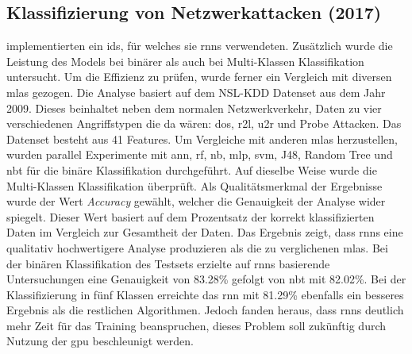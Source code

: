 \documentclass[
    12pt, %
    DIV10,
    ngerman, %
    a4paper, %
    oneside, %
    titlepage, %
    parskip=half, %
    headings=normal, %
    listof=totoc, %
    bibliography=totoc, %
    index=totoc, %
    captions=tableheading, %
    final %
]{scrreprt}
\begin{document}
\subsection{Klassifizierung von Netzwerkattacken (2017)}
\textcite{Yin2017} implementierten ein \ac{ids}, für welches sie \ac{rnns} verwendeten. Zusätzlich wurde die Leistung des Models bei binärer als auch bei Multi-Klassen Klassifikation untersucht. Um die Effizienz zu prüfen, wurde ferner ein Vergleich mit diversen \ac{mlas} gezogen. Die Analyse basiert auf dem NSL-KDD Datenset aus dem Jahr 2009. Dieses beinhaltet neben dem normalen Netzwerkverkehr, Daten zu vier verschiedenen Angriffstypen die da wären: \ac{dos}, \ac{r2l}, \ac{u2r} und Probe Attacken. Das Datenset besteht aus 41 Features. Um Vergleiche mit anderen \ac{mlas} herzustellen, wurden parallel Experimente mit \ac{ann}, \ac{rf}, \ac{nb}, \ac{mlp}, \ac{svm}, J48, Random Tree und \ac{nbt} für die binäre Klassifikation durchgeführt. Auf dieselbe Weise wurde die Multi-Klassen Klassifikation überprüft. Als Qualitätsmerkmal der Ergebnisse wurde der Wert \emph{Accuracy} gewählt, welcher die Genauigkeit der Analyse wider spiegelt. Dieser Wert basiert auf dem Prozentsatz der korrekt klassifizierten Daten im Vergleich zur Gesamtheit der Daten. Das Ergebnis zeigt, dass \ac{rnns} eine qualitativ hochwertigere Analyse produzieren als die zu verglichenen \ac{mlas}. Bei der binären Klassifikation des Testsets erzielte auf \ac{rnns} basierende Untersuchungen eine Genauigkeit von 83.28\% gefolgt von \ac{nbt} mit 82.02\%. Bei der Klassifizierung in fünf Klassen erreichte das \ac{rnn} mit 81.29\% ebenfalls ein besseres Ergebnis als die restlichen Algorithmen. Jedoch fanden \textcite{Yin2017} heraus, dass \ac{rnns} deutlich mehr Zeit für das Training beanspruchen, dieses Problem soll zukünftig durch Nutzung der \ac{gpu} beschleunigt werden.
%
\end{document}

